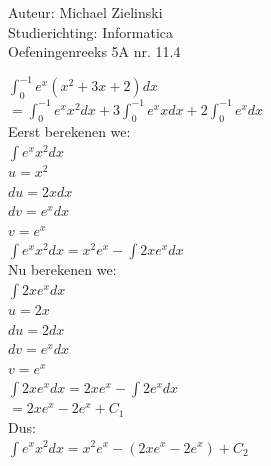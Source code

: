 \documentclass[a4paper]{article}
\begin{document}
  
\noindent \large Auteur: Michael Zielinski \\
\noindent \large Studierichting: Informatica \\
\noindent \large Oefeningenreeks 5A nr. 11.4 \\

\medskip

\normalsize

$ \displaystyle\int_{0}^{-1} e^x(x^2+3x+2) dx $ \\

$ = \displaystyle\int_{0}^{-1} e^x x^2 dx + 3\displaystyle\int_{0}^{-1} e^x x dx + 2\displaystyle\int_{0}^{-1} e^x dx $ \\

Eerst berekenen we: \\

$ \displaystyle\int e^x x^2 dx $ \\

$ u = x^2 $ \\

$ du = 2x dx $ \\

$ dv = e^x dx $ \\

$ v = e^x $ \\

$ \displaystyle\int e^x x^2 dx = x^2e^x - \displaystyle\int 2xe^x dx $ \\

Nu berekenen we: \\

$ \displaystyle\int 2xe^x dx $ \\

$ u = 2x $ \\

$ du = 2 dx $ \\

$ dv = e^x dx $ \\

$ v = e^x $ \\

$ \displaystyle\int 2xe^x dx = 2xe^x - \displaystyle\int 2e^x dx $ \\

$ = 2xe^x - 2e^x + C_1 $ \\

Dus: \\

$ \displaystyle\int e^x x^2 dx = x^2e^x - (2xe^x - 2e^x) + C_2 $ \\
\end{document}
